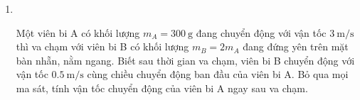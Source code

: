 \begin{enumerate}[label=\bfseries Bài \arabic*:,leftmargin=1.5cm]
\item {}\\
{Một viên bi A có khối lượng $m_A=\SI{300}{\gram}$ đang chuyển động với vận tốc $\SI{3}{\meter/\second}$ thì va chạm với viên bi B có khối lượng $m_B=2m_A$ đang đứng yên trên mặt bàn nhẵn, nằm ngang. Biết sau thời gian va chạm, viên bi B chuyển động với vận tốc $\SI{0.5}{\meter/\second}$ cùng chiều chuyển động ban đầu của viên bi A. Bỏ qua mọi ma sát, tính vận tốc chuyển động của viên bi A ngay sau va chạm.

}
\end{enumerate}